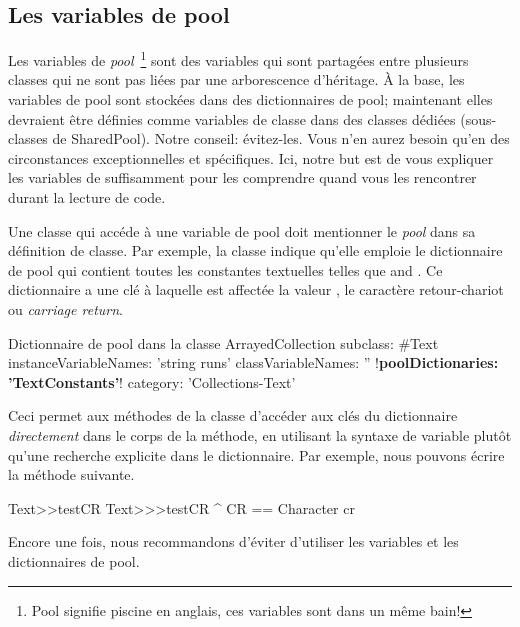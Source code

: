 \documentclass[a4paper,10pt,twoside]{book}
\begin{document}
\subsection{Les variables de pool}
Les variables de \emph{pool}~\footnote{Pool signifie piscine en anglais, ces variables sont dans un m\^eme bain!} sont des variables qui sont partag\'ees entre plusieurs classes qui ne sont pas li\'ees par une arborescence d'h\'eritage.
\`A la base, les variables de pool sont stock\'ees dans des dictionnaires
de pool;  maintenant elles devraient \^etre d\'efinies comme variables
de classe dans des classes d\'edi\'ees (sous-classes de SharedPool).
Notre conseil: \'evitez-les. Vous n'en aurez besoin qu'en des circonstances
exceptionnelles et sp\'ecifiques.
Ici, notre but est de vous expliquer les variables de  suffisamment pour
les comprendre quand vous les rencontrer durant la lecture de code.

Une classe qui acc\'ede \`a une variable de pool doit mentionner le \emph{pool}
dans sa d\'efinition de classe.
Par exemple, la classe  indique qu'elle emploie le dictionnaire
de pool  qui contient toutes les constantes textuelles
telles que 
 and . 
Ce dictionnaire a une cl\'e  \`a laquelle est affect\'ee la valeur
, \ie le caract\`ere retour-chariot ou \emph{carriage return}.

\begin{classdef}[textpooldict]{Dictionnaire de pool dans la classe }
ArrayedCollection subclass: #Text
        instanceVariableNames: 'string runs' 	
        classVariableNames: '' 	
        !\textbf{poolDictionaries: 'TextConstants'}!
        category: 'Collections-Text'
\end{classdef}
   
Ceci permet aux m\'ethodes de la classe  d'acc\'eder aux cl\'es
du dictionnaire \emph{directement} dans le corps de la m\'ethode, \ie 
en utilisant la syntaxe de variable plut\^ot qu'une recherche explicite
dans le dictionnaire.
Par exemple, nous pouvons \'ecrire la m\'ethode suivante.
  
\begin{method}[texttestcr]{Text>>testCR}
Text>>>testCR 	
      ^ CR == Character cr
\end{method}

Encore une fois, nous recommandons d'\'eviter d'utiliser
les variables et les dictionnaires de pool.
\end{document}
